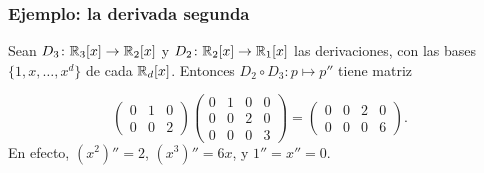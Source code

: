 \begin{frame}
    \frametitle{Ejemplo: la derivada segunda}

    \begin{example}
        Sean $D_3\colon\mathbb{R}_3[x]\to\mathbb{R}_2[x]$ y $D_2\colon\mathbb{R}_2[x]\to\mathbb{R}_1[x]$ las
        derivaciones, con las bases $\{1,x,\ldots,x^d\}$ de cada $\mathbb{R}_d[x]$.
        Entonces $D_2\circ D_3\colon p\mapsto p''$ tiene matriz
    \end{example}
    \[
        \begin{pmatrix}
            0&1&0\\
            0&0&2
        \end{pmatrix}
        \begin{pmatrix}
            0&1&0&0\\
            0&0&2&0\\
            0&0&0&3
        \end{pmatrix}
        =
        \begin{pmatrix}
            0&0&2&0\\
            0&0&0&6
        \end{pmatrix}.
    \]
    En efecto, $(x^2)''=2$, $(x^3)''=6x$, y $1''=x''=0$.
\end{frame}


